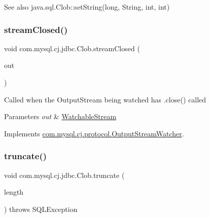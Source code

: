 \begin{DoxySeeAlso}{See also}
java.\+sql.\+Clob\+::set\+String(long, String, int, int) 
\end{DoxySeeAlso}
\mbox{\label{classcom_1_1mysql_1_1cj_1_1jdbc_1_1_clob_afce3b43001378654ee8a1d99c8685eeb}} 
\subsubsection{\texorpdfstring{stream\+Closed()}{streamClosed()}}
{\footnotesize\ttfamily void com.\+mysql.\+cj.\+jdbc.\+Clob.\+stream\+Closed (\begin{DoxyParamCaption}\item[{\mbox{\hyperlink{interfacecom_1_1mysql_1_1cj_1_1protocol_1_1_watchable_stream}{Watchable\+Stream}}}]{out }\end{DoxyParamCaption})}

Called when the Output\+Stream being watched has .close() called


\begin{DoxyParams}{Parameters}
{\em out} & \mbox{\hyperlink{}{Watchable\+Stream}} \\
\hline
\end{DoxyParams}


Implements \mbox{\hyperlink{interfacecom_1_1mysql_1_1cj_1_1protocol_1_1_output_stream_watcher_ab830e1917ebb2d14757c5fd1f5dc35ab}{com.\+mysql.\+cj.\+protocol.\+Output\+Stream\+Watcher}}.

\mbox{\label{classcom_1_1mysql_1_1cj_1_1jdbc_1_1_clob_a2038effd43fab99bf2553026fe76131c}} 
\subsubsection{\texorpdfstring{truncate()}{truncate()}}
{\footnotesize\ttfamily void com.\+mysql.\+cj.\+jdbc.\+Clob.\+truncate (\begin{DoxyParamCaption}\item[{long}]{length }\end{DoxyParamCaption}) throws S\+Q\+L\+Exception}

